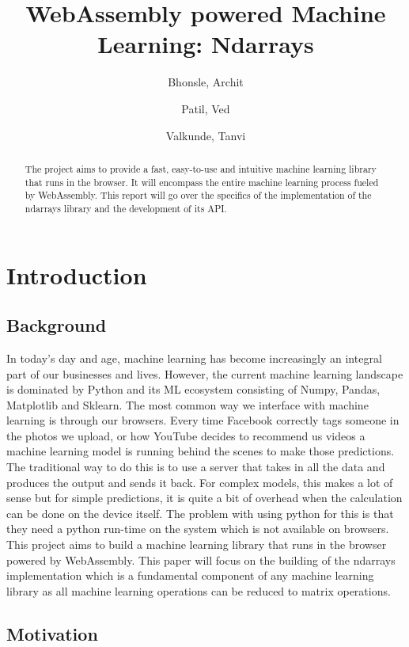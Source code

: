 \documentclass[a4paper,12pt]{report}
\title{WebAssembly powered Machine Learning: Ndarrays}
\author{
  Bhonsle, Archit\\
  \and
  Patil, Ved\\
  \and
  Valkunde, Tanvi\\
}
\begin{document}
\maketitle

\begin{abstract}
  The project aims to provide a fast, easy-to-use and intuitive machine learning
  library that runs in the browser. It will encompass the entire machine
  learning process fueled by WebAssembly. This report will go over the
  specifics of the implementation of the ndarrays library and the development
  of its API.
\end{abstract}

\tableofcontents

\chapter{Introduction}

\section{Background}

In today’s day and age, machine learning has become increasingly an integral part of our businesses and lives. However, the current machine learning
landscape is dominated by Python and its ML ecosystem consisting of Numpy,
Pandas, Matplotlib and Sklearn. The most common way we interface with machine
learning is through our browsers. Every time Facebook correctly tags someone in
the photos we upload, or how YouTube decides to recommend us videos a machine
learning model is running behind the scenes to make those predictions. The
traditional way to do this is to use a server that takes in all the data and
produces the output and sends it back. For complex models, this makes a lot of
sense but for simple predictions, it is quite a bit of overhead when the
calculation can be done on the device itself. The problem with using python for
this is that they need a python run-time on the system which is not available on
browsers. This project aims to build a machine learning library that runs in
the browser powered by WebAssembly. This paper will focus on the building of the
ndarrays implementation which is a fundamental component of any machine
learning library as all machine learning operations can be reduced to matrix
operations.

\section{Motivation}
\end{document}
